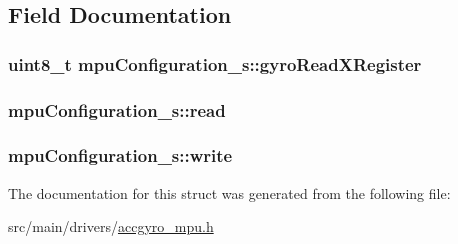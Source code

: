 \subsection{Field Documentation}
\hypertarget{structmpuConfiguration__s_a910fbcafe44034a1cadd8eb183a9ec1c}{
\subsubsection[{gyro\+Read\+X\+Register}]{\setlength{\rightskip}{0pt plus 5cm}uint8\+\_\+t mpu\+Configuration\+\_\+s\+::gyro\+Read\+X\+Register}}\label{structmpuConfiguration__s_a910fbcafe44034a1cadd8eb183a9ec1c}
\hypertarget{structmpuConfiguration__s_ab5fd834d2be8ec55a4bb92ba10469369}{
\subsubsection[{read}]{ mpu\+Configuration\+\_\+s\+::read}}\label{structmpuConfiguration__s_ab5fd834d2be8ec55a4bb92ba10469369}
\hypertarget{structmpuConfiguration__s_a839a826e244157a65b8b185760e5f0e8}{
\subsubsection[{write}]{ mpu\+Configuration\+\_\+s\+::write}}\label{structmpuConfiguration__s_a839a826e244157a65b8b185760e5f0e8}


The documentation for this struct was generated from the following file\+:\begin{DoxyCompactItemize}
\item 
src/main/drivers/\hyperlink{accgyro__mpu_8h}{accgyro\+\_\+mpu.\+h}\end{DoxyCompactItemize}
